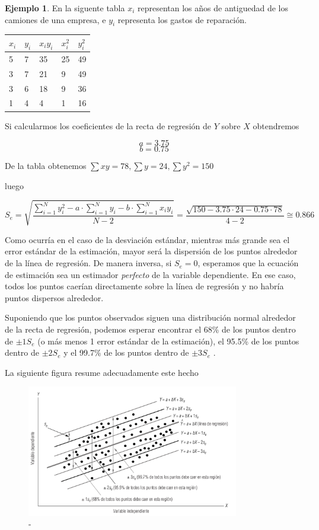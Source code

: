 \documentclass[]{book}
\theoremstyle{plain}
\theoremstyle{definition}
\newtheorem{example}[theorem]{Ejemplo}
\begin{document}
\begin{example}
  
En la siguente tabla \(x_i\) representan los años de antiguedad de los
camiones de una empresa, e \(y_i\) representa los gastos de reparación.

\begin{longtable}[]{@{}lllll@{}}
\toprule
\(x_i\) & \(y_i\) & \(x_iy_i\) & \(x_i^2\) & \(y_i^2\)\tabularnewline
\midrule
\endhead
5 & 7 & 35 & 25 & 49\tabularnewline
3 & 7 & 21 & 9 & 49\tabularnewline
3 & 6 & 18 & 9 & 36\tabularnewline
1 & 4 & 4 & 1 & 16\tabularnewline
\bottomrule
\end{longtable}

Si calcularmos los coeficientes de la recta de regresión de \(Y\) sobre
\(X\) obtendremos

\[a=3.75\] \[b=0.75\]

De la tabla obtenemos \(\sum xy = 78, \sum y = 24, \sum y^2 = 150\)

luego

\[S_e = \sqrt{\frac{\sum^N_{i=1} y_i^2 - a \cdot \sum^N_{i=1} y_i - b\cdot \sum^N_{i=1} x_i y_i }{N-2}} = \frac{ \sqrt{150 - 3.75 \cdot24 - 0.75 \cdot 78}}{4-2} \cong 0.866\]

\end{example}


Como ocurría en el caso de la desviación estándar, mientras más grande
sea el error estándar de la estimación, mayor será la dispersión de los
puntos alrededor de la línea de regresión. De manera inversa, si
\(S_e=0\), esperamos que la ecuación de estimación sea un estimador
\emph{perfecto} de la variable dependiente. En ese caso, todos los
puntos caerían directamente sobre la línea de regresión y no habría
puntos dispersos alrededor.

Suponiendo que los puntos observados siguen una distribución normal
alrededor de la recta de regresión, podemos esperar encontrar el 68\% de
los puntos dentro de \(\pm 1 S_e\) (o más menos 1 error estándar de la
estimación), el 95.5\% de los puntos dentro de \(\pm 2 S_e\) y el 99.7\%
de los puntos dentro de \(\pm 3 S_e\) .

La siguiente figura resume adecuadamente este hecho

\begin{figure}
\centering
\includegraphics[width=3.64583in,height=\textheight]{img/error_regression_2.png}
\caption{-}
\end{figure}
\end{document}
